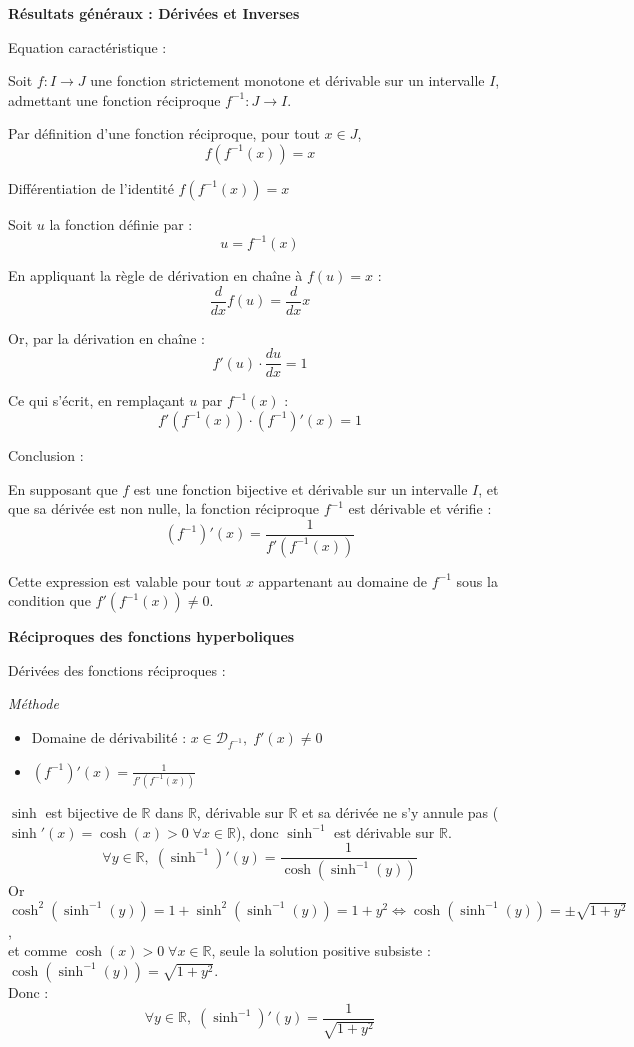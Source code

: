 \documentclass[10pt,a4paper]{article}
\begin{document}
\bigskip
\textbf{Résultats généraux : Dérivées et Inverses}

\q Equation caractéristique :

Soit \( f : I \to J \) une fonction strictement monotone et dérivable sur un intervalle \( I \),
admettant une fonction réciproque \( f^{-1} : J \to I \).

Par définition d'une fonction réciproque, pour tout \( x \in J \),
\[
f(f^{-1}(x)) = x
\]


\q Différentiation de l'identité \( f(f^{-1}(x)) = x \)

Soit \( u \) la fonction définie par :
\[
u = f^{-1}(x)
\]

En appliquant la règle de dérivation en chaîne à \( f(u) = x \) :
\[
\frac{d}{dx} f(u) = \frac{d}{dx} x
\]

Or, par la dérivation en chaîne :
\[
f'(u) \cdot \frac{du}{dx} = 1
\]

Ce qui s'écrit, en remplaçant \( u \) par \( f^{-1}(x) \) :
\[
f'(f^{-1}(x)) \cdot (f^{-1})'(x) = 1
\]


\q Conclusion :

En supposant que \( f \) est une fonction bijective et dérivable sur un intervalle \( I \), et que
sa dérivée est non nulle, la fonction réciproque \( f^{-1} \) est dérivable et vérifie :
\[
(f^{-1})'(x) = \frac{1}{f'(f^{-1}(x))}
\]

Cette expression est valable pour tout \( x \) appartenant au domaine de \( f^{-1} \) sous la
condition que \( f'(f^{-1}(x)) \neq 0 \).

\bigskip
\textbf{Réciproques des fonctions hyperboliques}

\q Dérivées des fonctions réciproques :

\emph{Méthode}
\begin{itemize}
    \item Domaine de dérivabilité : $ x \in \mathcal{D}_{f^{-1}}, \; f'(x) \neq 0 $
    \item $(f^{-1})'(x) = \frac{1}{f'(f^{-1}(x))}$
\end{itemize}

\bigskip
{}

$\sinh$ est bijective de $\mathbb{R}$ dans $\mathbb{R}$, dérivable sur $\mathbb{R}$ et sa dérivée ne
s'y annule pas ($\sinh'(x) = \cosh(x) > 0 \; \forall x \in \mathbb{R}$), donc $\sinh^{-1}$ est
dérivable sur $\mathbb{R}$.\\
$$\forall y \in \mathbb{R}, \; (\sinh^{-1})'(y) = \frac{1}{\cosh(\sinh^{-1}(y))}$$
Or $\cosh^2(\sinh^{-1}(y)) = 1 + \sinh^2(\sinh^{-1}(y)) = 1 + y^2 \iff \cosh(\sinh^{-1}(y)) = \pm
\sqrt{1 + y^2}$,\\ et comme $\cosh(x) > 0 \; \forall x \in \mathbb{R}$, seule la solution positive
subsiste : $\cosh(\sinh^{-1}(y)) = \sqrt{1 + y^2}$.\\
Donc : $$\forall y \in \mathbb{R}, \; (\sinh^{-1})'(y) = \frac{1}{\sqrt{1 + y^2}}$$
\end{document}
